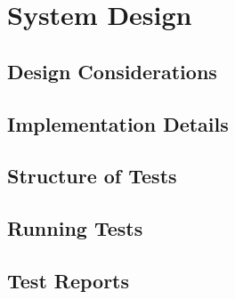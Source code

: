 \section{System Design}

\subsection{Design Considerations}
\subsection{Implementation Details}
\subsection{Structure of Tests}
\subsection{Running Tests}
\subsection{Test Reports}
